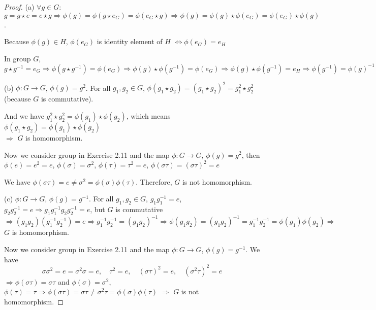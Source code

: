 \begin{proof}
    (a) $\forall g \in G$: $g = g \star e = e \star g \Rightarrow \phi(g) = \phi(g \star e_G) = \phi(e_G \star g) \Rightarrow \phi(g) = \phi(g) \star \phi(e_G) = \phi(e_G) \star \phi(g)$.

    Because $\phi(g) \in H$, $\phi(e_G)$ is identity element of $H$ $\Leftrightarrow \phi(e_G) = e_H$

    In group $G$, $g \star g^{-1} = e_G \Rightarrow \phi(g \star g^{-1}) = \phi(e_G) \Rightarrow \phi(g) \star \phi(g^{-1}) = \phi(e_G) \Rightarrow \phi(g) \star \phi(g^{-1}) = e_H \Rightarrow \phi(g^{-1}) = \phi(g)^{-1}$

    (b) $\phi: G \rightarrow G$, $\phi(g) = g^2$. For all $g_1, g_2 \in G$, $\phi(g_1 \star g_2) = (g_1 \star g_2)^2 = g_1^2 \star g_2^2$ (because $G$ is commutative).

    And we have $g_1^2 \star g_2^2 = \phi(g_1) \star \phi(g_2)$, which means $\phi(g_1 \star g_2) = \phi(g_1) \star \phi(g_2)$ \\ $\Rightarrow$ $G$ is homomorphism.

    Now we consider group in Exercise 2.11 and the map $\phi: G \rightarrow G$, $\phi(g)=g^2$, then $\phi(e) = e^2 = e$, $\phi(\sigma) = \sigma^2$, $\phi(\tau) = \tau^2 = e$, $\phi(\sigma\tau) = (\sigma\tau)^2 = e$

    We have $\phi(\sigma\tau) = e \neq \sigma^2 = \phi(\sigma)\phi(\tau)$. Therefore, $G$ is not homomorphism.

    (c) $\phi: G \rightarrow G$, $\phi(g) = g^{-1}$. For all $g_1, g_2 \in G$, $g_1 g_1^{-1} = e$, $g_2 g_2^{-1} = e \Rightarrow g_1 g_1^{-1} g_2 g_2^{-1} = e$, but $G$ is commutative $\Rightarrow (g_1 g_2)(g_1^{-1} g_2^{-1}) = e \Rightarrow g_1^{-1} g_2^{-1} = (g_1 g_2)^{-1} \Rightarrow \phi(g_1 g_2) = (g_1 g_2)^{-1} = g_1^{-1} g_2^{-1} = \phi(g_1) \phi(g_2) \Rightarrow$ $G$ is homomorphism.

    Now we consider group in Exercise 2.11 and the map $\phi: G \rightarrow G$, $\phi(g) = g^{-1}$. We have
    \begin{equation*}
        \sigma\sigma^2 = e = \sigma^2\sigma = e, \quad \tau^2 = e, \quad (\sigma\tau)^2 = e, \quad (\sigma^2\tau)^2 = e
    \end{equation*}
    $\Rightarrow \phi(\sigma\tau) = \sigma\tau$ \quad and \quad $\phi(\sigma) = \sigma^2$, $\phi(\tau) = \tau \Rightarrow \phi(\sigma\tau) = \sigma\tau \neq \sigma^2\tau = \phi(\sigma)\phi(\tau)$ $\Rightarrow$ $G$ is not homomorphism.
\end{proof}

